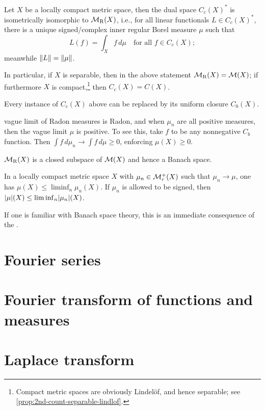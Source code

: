 \begin{namedthm} \label{thm:Riesz2}
    Let $X$ be a locally compact metric space, then the dual space $C_c(X)^*$ is isometrically isomorphic to $\mathcal{M}_\mathrm{R}(X)$, i.e., for all linear functionals $L \in C_c(X)^*$, there is a unique signed/complex inner regular Borel measure $\mu$ such that \[
        L(f) = \int_X f\,d\mu\quad \text{for all }f\in C_c(X);
    \] meanwhile $\lVert L \rVert = \lVert \mu \rVert$.

    In particular, if $X$ is separable, then in the above statement $\mathcal{M}_\mathrm{R}(X) = \mathcal{M}(X)$; if furthermore $X$ is compact,\footnote{Compact metric spaces are obviously Lindelöf, and hence separable; see \cref{prop:2nd-count-separable-lindlof}.} then $C_c(X) = C(X)$.

    Every instance of $C_c(X)$ above can be replaced by its uniform closure $C_0(X)$.
\end{namedthm}



vague limit of Radon measures is Radon, and when $\mu_n$ are all positive measures, then the vague limit $\mu$ is positive. To see this, take $f$ to be any nonnegative $C_b$ function. Then $\int f\,d\mu_{n} \to \int f\,d\mu \geq 0$, enforcing $\mu(X) \geq 0$.

\begin{cor}
    $\mathcal{M}_\mathrm{R}(X)$ is a closed subspace of $\mathcal{M}(X)$ and hence a Banach space.
\end{cor}

\begin{prop}
    In a locally compact metric space $X$ with $\mu_n \in \mathcal{M}_r^{+}(X)$ such that $\mu_n \to \mu$, one has $\mu(X) \leq \liminf_n \mu_n (X)$. If $\mu_n$ is allowed to be signed, then $\lvert \mu \rvert(X) \leq \liminf_n \lvert \mu_n \rvert (X)$.
\end{prop}

If one is familiar with Banach space theory, this is an immediate consequence of the .

\section{Fourier series}

\section{Fourier transform of functions and measures}

\section{Laplace transform}

